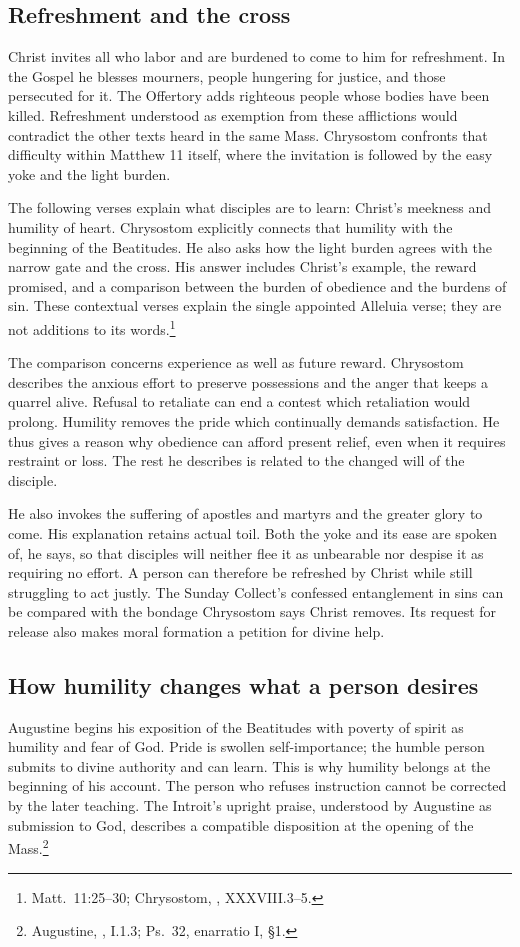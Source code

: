 
\subsection{Refreshment and the cross}
Christ invites all who labor and are burdened to come to him for
refreshment. In the Gospel he blesses mourners, people hungering for
justice, and those persecuted for it. The Offertory adds righteous people
whose bodies have been killed. Refreshment understood as exemption from
these afflictions would contradict the other texts heard in the same Mass.
Chrysostom confronts that difficulty within Matthew 11 itself, where the
invitation is followed by the easy yoke and the light burden.

The following verses explain what disciples are to learn: Christ's
meekness and humility of heart. Chrysostom explicitly connects that
humility with the beginning of the Beatitudes. He also asks how the light
burden agrees with the narrow gate and the cross. His answer includes
Christ's example, the reward promised, and a comparison between the
burden of obedience and the burdens of sin. These contextual verses
explain the single appointed Alleluia verse; they are not additions to
its words.\footnote{Matt.~11:25--30; Chrysostom,
, XXXVIII.3--5.}

The comparison concerns experience as well as future reward. Chrysostom
describes the anxious effort to preserve possessions and the anger that
keeps a quarrel alive. Refusal to retaliate can end a contest which
retaliation would prolong. Humility removes the pride which continually
demands satisfaction. He thus gives a reason why obedience can afford
present relief, even when it requires restraint or loss. The rest he
describes is related to the changed will of the disciple.

He also invokes the suffering of apostles and martyrs and the greater
glory to come. His explanation retains actual toil. Both the yoke and its
ease are spoken of, he says, so that disciples will neither flee it as
unbearable nor despise it as requiring no effort. A person can therefore
be refreshed by Christ while still struggling to act justly. The
Sunday Collect's confessed entanglement in sins can be compared with
the bondage Chrysostom says Christ removes. Its request for release
also makes moral formation a petition for divine help.

\subsection{How humility changes what a person desires}
Augustine begins his exposition of the Beatitudes with poverty of spirit
as humility and fear of God. Pride is swollen self-importance; the humble
person submits to divine authority and can learn. This is why humility
belongs at the beginning of his account. The person who refuses instruction
cannot be corrected by the later teaching. The Introit's upright praise,
understood by Augustine as submission to God, describes a compatible
disposition at the opening of the Mass.\footnote{Augustine,
, I.1.3; Ps.~32, enarratio I, \S1.}

